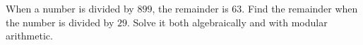 When a number is divided by $899$, the remainder is $63$. Find the remainder when the number is divided by $29$. Solve it both algebraically and with modular arithmetic.
